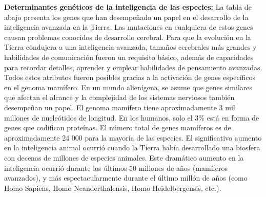 \documentclass[a4paper]{article}
\newcounter{problema}
\begin{document}
\begin{problema}
\textbf{Determinantes genéticos de la inteligencia de las especies:} La tabla de abajo presenta los genes que han desempeñado un papel en el desarrollo de la inteligencia avanzada en la Tierra. 
Las mutaciones en cualquiera de estos genes causan problemas conocidos de desarrollo cerebral.
Para que la evolución en la Tierra condujera a una inteligencia avanzada, tamaños cerebrales más grandes y habilidades de comunicación fueron un requisito básico, 
además de capacidades para recordar detalles, aprender y emplear habilidades de pensamiento avanzadas. 
Todos estos atributos fueron posibles gracias a la activación de genes específicos en el genoma mamífero.
En un mundo alienígena, se asume que genes similares que afectan el alcance y la complejidad de los sistemas nerviosos también desempeñan un papel.
El genoma mamífero tiene aproximadamente 3 mil millones de nucleótidos de longitud. En los humanos, solo el $3\%$ está en forma de genes que codifican proteínas. 
El número total de genes mamíferos es de aproximadamente 24 000 para la mayoría de las especies. 
El significativo aumento en la inteligencia animal ocurrió cuando la Tierra había desarrollado una biosfera con decenas de millones de especies animales.
Este dramático aumento en la inteligencia ocurrió durante los últimos 50 millones de años (mamíferos avanzados), 
y más espectacularmente durante el último millón de años (como Homo Sapiens, Homo Neanderthalensis, Homo Heidelbergensis, etc.).


\end{problema}
\end{document}
